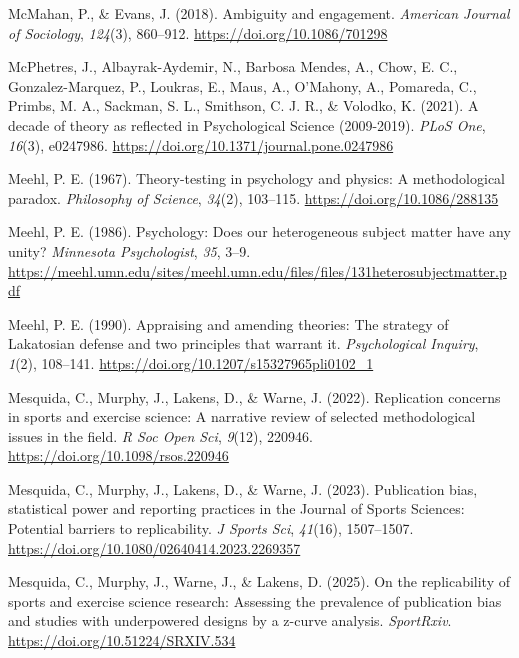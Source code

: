 \documentclass[
]{article}
\newlength{\cslhangindent}
\newenvironment{CSLReferences}[2] %
 {\begin{list}{}{%
  \setlength{\itemindent}{0pt}
  \setlength{\leftmargin}{0pt}
  \setlength{\parsep}{0pt}
  \ifodd #1
   \setlength{\leftmargin}{\cslhangindent}
   \setlength{\itemindent}{-1\cslhangindent}
  \fi
  \setlength{\itemsep}{#2\baselineskip}}}
 {\end{list}}
\begin{document}
\begin{CSLReferences}{1}{0}
McMahan, P., \& Evans, J. (2018). Ambiguity and engagement.
\emph{American Journal of Sociology}, \emph{124}(3), 860--912.
\url{https://doi.org/10.1086/701298}

McPhetres, J., Albayrak-Aydemir, N., Barbosa Mendes, A., Chow, E. C.,
Gonzalez-Marquez, P., Loukras, E., Maus, A., O'Mahony, A., Pomareda, C.,
Primbs, M. A., Sackman, S. L., Smithson, C. J. R., \& Volodko, K.
(2021). A decade of theory as reflected in {Psychological} {Science}
(2009-2019). \emph{PLoS One}, \emph{16}(3), e0247986.
\url{https://doi.org/10.1371/journal.pone.0247986}

Meehl, P. E. (1967). Theory-testing in psychology and physics: {A}
methodological paradox. \emph{Philosophy of Science}, \emph{34}(2),
103--115. \url{https://doi.org/10.1086/288135}

Meehl, P. E. (1986). Psychology: {Does} our heterogeneous subject matter
have any unity? \emph{Minnesota Psychologist}, \emph{35}, 3--9.
\url{https://meehl.umn.edu/sites/meehl.umn.edu/files/files/131heterosubjectmatter.pdf}

Meehl, P. E. (1990). Appraising and amending theories: {The} strategy of
{Lakatosian} defense and two principles that warrant it.
\emph{Psychological Inquiry}, \emph{1}(2), 108--141.
\url{https://doi.org/10.1207/s15327965pli0102_1}

Mesquida, C., Murphy, J., Lakens, D., \& Warne, J. (2022). Replication
concerns in sports and exercise science: A narrative review of selected
methodological issues in the field. \emph{R Soc Open Sci}, \emph{9}(12),
220946. \url{https://doi.org/10.1098/rsos.220946}

Mesquida, C., Murphy, J., Lakens, D., \& Warne, J. (2023). Publication
bias, statistical power and reporting practices in the {Journal} of
{Sports} {Sciences}: Potential barriers to replicability. \emph{J Sports
Sci}, \emph{41}(16), 1507--1507.
\url{https://doi.org/10.1080/02640414.2023.2269357}

Mesquida, C., Murphy, J., Warne, J., \& Lakens, D. (2025). On the
replicability of sports and exercise science research: Assessing the
prevalence of publication bias and studies with underpowered designs by
a z-curve analysis. \emph{SportRxiv}.
\url{https://doi.org/10.51224/SRXIV.534}


\end{CSLReferences}
\end{document}
